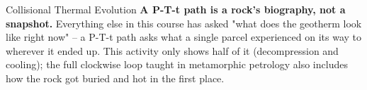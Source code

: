 \begin{activity}{Collisional Thermal Evolution}
\textbf{A P-T-t path is a rock's biography, not a snapshot.} Everything else in this course has asked "what does the geotherm look like right now" -- a P-T-t path asks what a single parcel experienced on its way to wherever it ended up. This activity only shows half of it (decompression and cooling); the full clockwise loop taught in metamorphic petrology also includes how the rock got buried and hot in the first place.

\end{activity}
